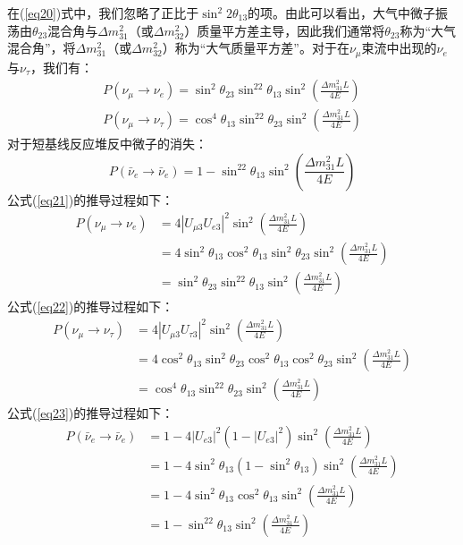 \documentclass{article}
\begin{document}
		在(\ref{eq20})式中，我们忽略了正比于$\sin^2 2\theta_{13}$的项。由此可以看出，大气中微子振荡由$\theta_{23}$混合角与$\Delta m_{31}^2$（或$\Delta m_{32}^2$）质量平方差主导，因此我们通常将$\theta_{23}$称为“大气混合角”，将$\Delta m_{31}^2$（或$\Delta m_{32}^2$）称为“大气质量平方差”。对于在$\nu_\mu$束流中出现的$\nu_e$与$\nu_\tau$，我们有：
		\begin{gather}
				\label{eq21}
			P(\nu_\mu\to\nu_e)=\sin^2\theta_{23}\sin^22\theta_{13}\sin^2\left(\frac{\Delta m_{31}^2L}{4E}\right)\\			P(\nu_\mu\to\nu_\tau)=\cos^4\theta_{13}\sin^22\theta_{23}\sin^2\left(\frac{\Delta m_{31}^2L}{4E}\right)
				\label{eq22}
		\end{gather}
		对于短基线反应堆反中微子的消失：
		\begin{equation}
			P(\bar{\nu}_e\to\bar{\nu}_e)=1-\sin^22\theta_{13}\sin^2\left(\frac{\Delta m_{31}^2L}{4E}\right)
			\label{eq23}
		\end{equation}
		公式(\ref{eq21})的推导过程如下：
		\begin{equation*}
			\begin{aligned}
				P(\nu_\mu\to\nu_e)&=4|U_{\mu3}U_{e3}|^2\sin^2\left(\frac{\Delta m_{31}^2L}{4E}\right)\\
			&=4\sin^2\theta_{13}\cos^2\theta_{13}\sin^2\theta_{23}\sin^2\left(\frac{\Delta m_{31}^2L}{4E}\right)\\
				&=\sin^2\theta_{23}\sin^22\theta_{13}\sin^2\left(\frac{\Delta m_{31}^2L}{4E}\right)
			\end{aligned}
		\end{equation*}
		公式(\ref{eq22})的推导过程如下：
		\begin{equation*}
			\begin{aligned}
				P(\nu_\mu\to\nu_\tau)&=4|U_{\mu3}U_{\tau3}|^2\sin^2\left(\frac{\Delta m_{31}^2L}{4E}\right)\\
				&=4\cos^2\theta_{13}\sin^2\theta_{23}\cos^2\theta_{13}\cos^2\theta_{23}\sin^2\left(\frac{\Delta m_{31}^2L}{4E}\right)\\
				&=\cos^4\theta_{13}\sin^22\theta_{23}\sin^2\left(\frac{\Delta m_{31}^2L}{4E}\right)
			\end{aligned}
		\end{equation*}
		公式(\ref{eq23})的推导过程如下：
		\begin{equation*}
			\begin{aligned}
				P(\bar{\nu}_e\to\bar{\nu}_e)&=1-4|U_{e3}|^2(1-|U_{e3}|^2)\sin^2\left(\frac{\Delta m_{31}^2L}{4E}\right)\\
				&=1-4\sin^2\theta_{13}(1-\sin^2\theta_{13})\sin^2\left(\frac{\Delta m_{31}^2L}{4E}\right)\\
				&=1-4\sin^2\theta_{13}\cos^2\theta_{13}\sin^2\left(\frac{\Delta m_{31}^2L}{4E}\right)\\
				&=1-\sin^22\theta_{13}\sin^2\left(\frac{\Delta m_{31}^2L}{4E}\right)
			\end{aligned}
		\end{equation*}
\end{document}
